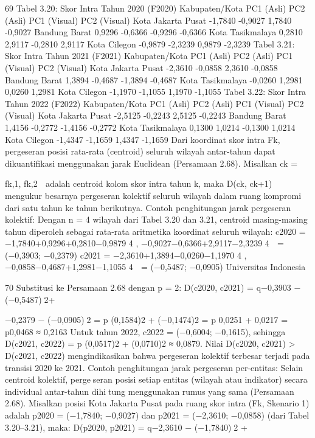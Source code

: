 69
Tabel 3.20: Skor Intra Tahun 2020 (F2020)
Kabupaten/Kota PC1 (Asli) PC2 (Asli) PC1 (Visual) PC2 (Visual)
Kota Jakarta Pusat -1,7840 -0,9027 1,7840 -0,9027
Bandung Barat 0,9296 -0,6366 -0,9296 -0,6366
Kota Tasikmalaya 0,2810 2,9117 -0,2810 2,9117
Kota Cilegon -0,9879 -2,3239 0,9879 -2,3239
Tabel 3.21: Skor Intra Tahun 2021 (F2021)
Kabupaten/Kota PC1 (Asli) PC2 (Asli) PC1 (Visual) PC2 (Visual)
Kota Jakarta Pusat -2,3610 -0,0858 2,3610 -0,0858
Bandung Barat 1,3894 -0,4687 -1,3894 -0,4687
Kota Tasikmalaya -0,0260 1,2981 0,0260 1,2981
Kota Cilegon -1,1970 -1,1055 1,1970 -1,1055
Tabel 3.22: Skor Intra Tahun 2022 (F2022)
Kabupaten/Kota PC1 (Asli) PC2 (Asli) PC1 (Visual) PC2 (Visual)
Kota Jakarta Pusat -2,5125 -0,2243 2,5125 -0,2243
Bandung Barat 1,4156 -0,2772 -1,4156 -0,2772
Kota Tasikmalaya 0,1300 1,0214 -0,1300 1,0214
Kota Cilegon -1,4347 -1,1659 1,4347 -1,1659
Dari koordinat skor intra Fk, pergeseran posisi rata-rata (centroid) seluruh wilayah
antar-tahun dapat dikuantifikasi menggunakan jarak Euclidean (Persamaan 2.68). Misalkan
ck =

fk,1, fk,2

adalah centroid kolom skor intra tahun k, maka D(ck, ck+1) mengukur
besarnya pergeseran kolektif seluruh wilayah dalam ruang kompromi dari satu tahun ke
tahun berikutnya.
Contoh penghitungan jarak pergeseran kolektif: Dengan n = 4 wilayah dari Tabel 3.20
dan 3.21, centroid masing-masing tahun diperoleh sebagai rata-rata aritmetika koordinat
seluruh wilayah:
c2020 =
 −1,7840+0,9296+0,2810−0,9879
4
,
−0,9027−0,6366+2,9117−2,3239
4

= (−0,3903; −0,2379)
c2021 =
 −2,3610+1,3894−0,0260−1,1970
4
,
−0,0858−0,4687+1,2981−1,1055
4

= (−0,5487; −0,0905)
Universitas Indonesia

70
Substitusi ke Persamaan 2.68 dengan p = 2:
D(c2020, c2021) = q−0,3903 − (−0,5487)2+

−0,2379 − (−0,0905)2
=
p
(0,1584)2 + (−0,1474)2
=
p
0,0251 + 0,0217 = p0,0468 ≈ 0,2163
Untuk tahun 2022, c2022 = (−0,6004; −0,1615), sehingga D(c2021, c2022) =
p
(0,0517)2 + (0,0710)2 ≈ 0,0879. Nilai D(c2020, c2021) > D(c2021, c2022)
mengindikasikan bahwa pergeseran kolektif terbesar terjadi pada transisi 2020 ke 2021.
Contoh penghitungan jarak pergeseran per-entitas: Selain centroid kolektif, pergeseran posisi setiap entitas (wilayah atau indikator) secara individual antar-tahun dihitung menggunakan rumus yang sama (Persamaan 2.68). Misalkan posisi Kota Jakarta
Pusat pada ruang skor intra (Fk, Skenario 1) adalah p2020 = (−1,7840; −0,9027) dan
p2021 = (−2,3610; −0,0858) (dari Tabel 3.20–3.21), maka:
D(p2020, p2021) = q−2,3610 − (−1,7840)2
+

